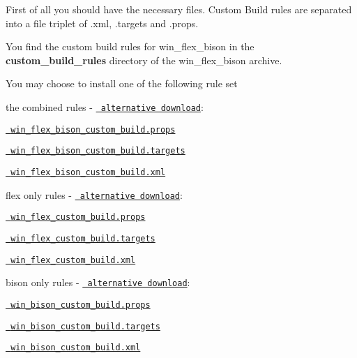 First of all you should have the necessary files. Custom Build rules are separated into a file triplet of {\ttfamily .xml}, {\ttfamily .targets} and {\ttfamily .props}.

You find the custom build rules for win\+\_\+flex\+\_\+bison in the {\bfseries{custom\+\_\+build\+\_\+rules}} directory of the win\+\_\+flex\+\_\+bison archive.

You may choose to install one of the following rule set


\begin{DoxyItemize}
\item the combined rules -\/ \href{https://sourceforge.net/projects/winflexbison/files/win_flex_bison_custom_build_rules.zip/download}{\texttt{ alternative download}}\+:
\begin{DoxyItemize}
\item \href{win_flex_bison/win_flex_bison_custom_build.props}{\texttt{ win\+\_\+flex\+\_\+bison\+\_\+custom\+\_\+build.\+props}}
\item \href{win_flex_bison/win_flex_bison_custom_build.targets}{\texttt{ win\+\_\+flex\+\_\+bison\+\_\+custom\+\_\+build.\+targets}}
\item \href{win_flex_bison/win_flex_bison_custom_build.xml}{\texttt{ win\+\_\+flex\+\_\+bison\+\_\+custom\+\_\+build.\+xml}}
\end{DoxyItemize}
\item flex only rules -\/ \href{https://sourceforge.net/projects/winflexbison/files/win_flex_custom_build_rules.zip/download}{\texttt{ alternative download}}\+:
\begin{DoxyItemize}
\item \href{win_flex_only/win_flex_custom_build.props}{\texttt{ win\+\_\+flex\+\_\+custom\+\_\+build.\+props}}
\item \href{win_flex_only/win_flex_custom_build.targets}{\texttt{ win\+\_\+flex\+\_\+custom\+\_\+build.\+targets}}
\item \href{win_flex_only/win_flex_custom_build.xml}{\texttt{ win\+\_\+flex\+\_\+custom\+\_\+build.\+xml}}
\end{DoxyItemize}
\item bison only rules -\/ \href{https://sourceforge.net/projects/winflexbison/files/win_bison_custom_build_rules.zip/download}{\texttt{ alternative download}}\+:
\begin{DoxyItemize}
\item \href{win_bison_only/win_bison_custom_build.props}{\texttt{ win\+\_\+bison\+\_\+custom\+\_\+build.\+props}}
\item \href{win_bison_only/win_bison_custom_build.targets}{\texttt{ win\+\_\+bison\+\_\+custom\+\_\+build.\+targets}}
\item \href{win_bison_only/win_bison_custom_build.xml}{\texttt{ win\+\_\+bison\+\_\+custom\+\_\+build.\+xml}}
\end{DoxyItemize}
\end{DoxyItemize}

